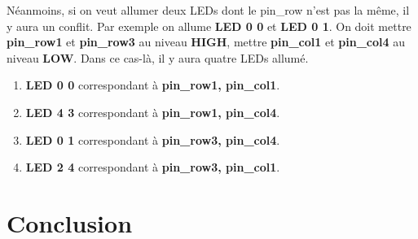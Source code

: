 \documentclass[14px]{article}
\begin{document}
Néanmoins, si on veut allumer deux LEDs dont le pin\_row n'est pas la même, il y aura un conflit. Par exemple on allume \textbf{LED 0 0} et \textbf{LED 0 1}. On doit mettre \textbf{pin\_row1} et \textbf{pin\_row3} au niveau \textbf{HIGH}, mettre \textbf{pin\_col1} et \textbf{pin\_col4} au niveau \textbf{LOW}. Dans ce cas-là, il y aura quatre LEDs allumé.
\begin{enumerate}
	\item \textbf{LED 0 0} correspondant à \textbf{pin\_row1, pin\_col1}.
	\item \textbf{LED 4 3} correspondant à \textbf{pin\_row1, pin\_col4}.
	\item \textbf{LED 0 1} correspondant à \textbf{pin\_row3, pin\_col4}.
	\item \textbf{LED 2 4} correspondant à \textbf{pin\_row3, pin\_col1}.
\end{enumerate}
\begin{figure}[htbp]
\end{figure}

\clearpage

\section{Conclusion}
\end{document}
